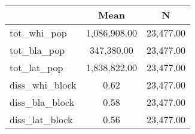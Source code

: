 {
\def\sym#1{\ifmmode^{#1}\else\(^{#1}\)\fi}
\begin{tabular}{l*{1}{cc}}
\hline\hline
                    &        Mean&           N\\
\hline
tot\_whi\_pop         &1,086,908.00&   23,477.00\\
tot\_bla\_pop         &  347,380.00&   23,477.00\\
tot\_lat\_pop         &1,838,822.00&   23,477.00\\
diss\_whi\_block      &        0.62&   23,477.00\\
diss\_bla\_block      &        0.58&   23,477.00\\
diss\_lat\_block      &        0.56&   23,477.00\\
\hline\hline
\end{tabular}
}
